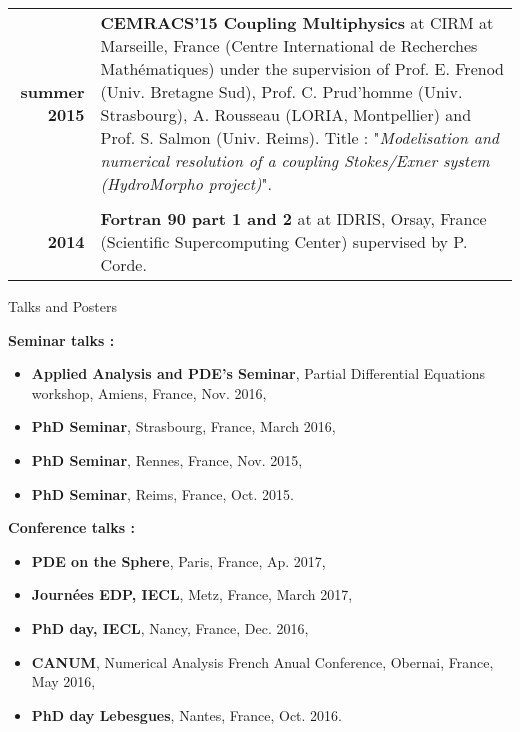 \documentclass[10pt,a4paper]{report}
\begin{document}
\begin{center}
\begin{tabular}{r p{12cm}}
\textbf{summer 2015} & \textbf{CEMRACS'15 Coupling Multiphysics} at CIRM at Marseille, France (Centre International de Recherches Mathématiques) under the supervision of Prof. E. Frenod (Univ. Bretagne Sud), Prof. C. Prud'homme (Univ. Strasbourg), A. Rousseau (LORIA, Montpellier) and Prof. S. Salmon (Univ. Reims).\newline
Title : "\textit{Modelisation and numerical resolution of a coupling Stokes/Exner system (HydroMorpho project)}".\\

& \\

\textbf{2014} & \textbf{Fortran 90 part 1 and 2} at at IDRIS, Orsay, France (Scientific Supercomputing Center) supervised by P. Corde.\\

\end{tabular}
\end{center}


\vspace{.5cm}
\newpage
\noindent
{\selectfont
\begin{Large}
Talks and Posters
\end{Large}
\hrulefill
}
\vspace{0.5cm}
\noindent

\noindent
{\selectfont
\textbf{Seminar talks :}
}

\begin{itemize}
\item \textbf{Applied Analysis and PDE's Seminar}, Partial Differential Equations workshop, Amiens, France, Nov. 2016,
\item \textbf{PhD Seminar}, Strasbourg, France, March 2016,
\item \textbf{PhD Seminar}, Rennes, France, Nov. 2015,
\item \textbf{PhD Seminar}, Reims, France, Oct. 2015.
\end{itemize}

\vspace{0.3cm}
\noindent
{\selectfont
\textbf{Conference talks :}
}

\begin{itemize}
\item \textbf{PDE on the Sphere}, Paris, France, Ap. 2017,
\item \textbf{Journées EDP, IECL}, Metz, France, March 2017,
\item \textbf{PhD day, IECL}, Nancy, France, Dec. 2016,
\item \textbf{CANUM}, Numerical Analysis French Anual Conference, Obernai, France, May 2016,
\item \textbf{PhD day Lebesgues}, Nantes, France, Oct. 2016.
\end{itemize}
\end{document}
